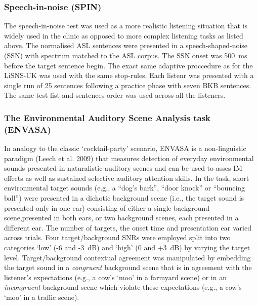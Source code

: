 \documentclass[a4paper,nobind]{templates/ociamthesis}
\begin{document}
\hypertarget{speech-in-noise-spin}{%
\subsubsection{Speech-in-noise (SPIN)}\label{speech-in-noise-spin}}

The speech-in-noise test was used as a more realistic listening
situation that is widely used in the clinic as opposed to more complex
listening tasks as listed above. The normalised ASL sentences were
presented in a speech-shaped-noise (SSN) with spectrum matched to the
ASL corpus. The SSN onset was 500~ms before the target sentence begin.
The exact same adaptive proccedure as for the LiSNS-UK was used with the
same stop-rules. Each listenr was presented with a single run of 25
sentences following a practice phase with seven BKB sentences. The same
test list and sentences order was used across all the listeners.

\hypertarget{the-environmental-auditory-scene-analysis-task-envasa}{%
\subsubsection{The Environmental Auditory Scene Analysis task
(ENVASA)}\label{the-environmental-auditory-scene-analysis-task-envasa}}

In analogy to the classic `cocktail-party' scenario, ENVASA is a
non-linguistic paradigm (Leech et al. 2009) that measures detection of
everyday environmental sounds presented in naturalistic auditory scenes
and can be used to asses IM effects as well as sustained selective
auditory attention skills. In the task, short environmental target
sounds (e.g., a ``dog's bark'', ``door knock'' or ``bouncing ball'')
were presented in a dichotic background scene (i.e., the target sound is
presented only in one ear) consisting of either a single background
scene,presented in both ears, or two background scenes, each presented
in a different ear. The number of targets, the onset time and
presentation ear varied across trials. Four target/background SNRs were
employed split into two categories `low' (-6 and -3~dB) and `high' (0
and +3~dB) by varying the target level. Target/background contextual
agreement was manipulated by embedding the target sound in a
\emph{congruent} background scene that is in agreement with the
listener's expectations (e.g., a cow's `moo' in a farmyard scene) or in
an \emph{incongruent} background scene which violate these expectations
(e.g., a cow's `moo' in a traffic scene).
\end{document}
